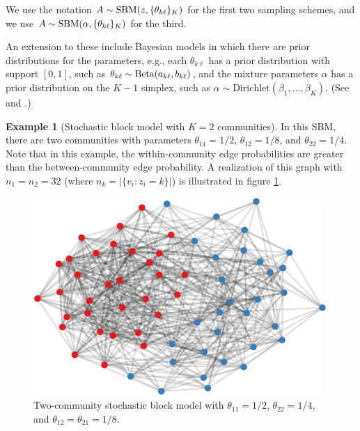 \documentclass[
  12pt,
]{article}
\theoremstyle{definition}
\theoremstyle{definition}
\newtheorem{example}{Example}[section]
\theoremstyle{definition}
\theoremstyle{definition}
\theoremstyle{remark}
\begin{document}
We use the notation \(A \sim \mathrm{SBM}(z, \{\theta_{k \ell}\}_K)\) for the first two sampling schemes, and we use \(A \sim \mathrm{SBM}(\alpha, \{\theta_{k \ell}\}_K)\) for the third.

An extension to these include Bayesian models in which there are prior distributions for the parameters, e.g., each \(\theta_{k \ell}\) has a prior distribution with support \([0, 1]\), such as \(\theta_{k \ell} \sim \mathrm{Beta}(a_{k \ell}, b_{k \ell})\), and the mixture parameters \(\alpha\) has a prior distribution on the \(K-1\) simplex, such as \(\alpha \sim \mathrm{Dirichlet}(\beta_1, ..., \beta_K)\).
(See \citet{RePEc:eee:csdana:v:60:y:2013:i:c:p:12-31} and \citet{10.2307/43974715}.)

\begin{example}[Stochastic block model with $K = 2$ communities]
\label{ex:assort-sbm}
In this SBM, there are two communities with parameters $\theta_{11} = 1/2$, $\theta_{12} = 1/8$, and $\theta_{22} = 1/4$. 
Note that in this example, the within-community edge probabilities are greater than the between-community edge probability. 
A realization of this graph with $n_1 = n_2 = 32$ (where $n_k = |\{v_i : z_i = k\}|$) is illustrated in figure \ref{fig:assort-sbm}.

\begin{figure}[H]

{\centering \includegraphics{draft_files/figure-latex/assort-sbm-1} 

}

\caption{Two-community stochastic block model with $\theta_{11}=1/2$, $\theta_{22}=1/4$, and $\theta_{12} = \theta_{21} = 1/8$.}\label{fig:assort-sbm}
\end{figure}
\end{example}
\end{document}
